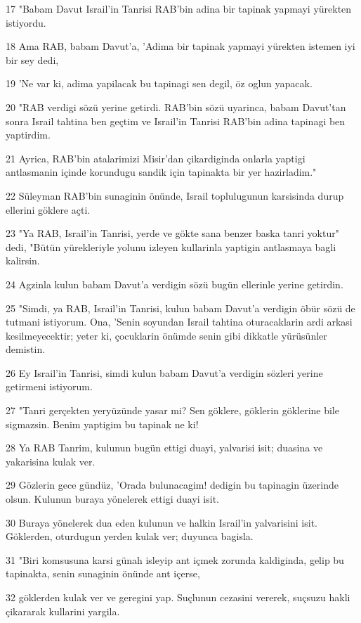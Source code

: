 \par 17 "Babam Davut Israil'in Tanrisi RAB'bin adina bir tapinak yapmayi yürekten istiyordu.
\par 18 Ama RAB, babam Davut'a, 'Adima bir tapinak yapmayi yürekten istemen iyi bir sey dedi,
\par 19 'Ne var ki, adima yapilacak bu tapinagi sen degil, öz oglun yapacak.
\par 20 "RAB verdigi sözü yerine getirdi. RAB'bin sözü uyarinca, babam Davut'tan sonra Israil tahtina ben geçtim ve Israil'in Tanrisi RAB'bin adina tapinagi ben yaptirdim.
\par 21 Ayrica, RAB'bin atalarimizi Misir'dan çikardiginda onlarla yaptigi antlasmanin içinde korundugu sandik için tapinakta bir yer hazirladim."
\par 22 Süleyman RAB'bin sunaginin önünde, Israil toplulugunun karsisinda durup ellerini göklere açti.
\par 23 "Ya RAB, Israil'in Tanrisi, yerde ve gökte sana benzer baska tanri yoktur" dedi, "Bütün yürekleriyle yolunu izleyen kullarinla yaptigin antlasmaya bagli kalirsin.
\par 24 Agzinla kulun babam Davut'a verdigin sözü bugün ellerinle yerine getirdin.
\par 25 "Simdi, ya RAB, Israil'in Tanrisi, kulun babam Davut'a verdigin öbür sözü de tutmani istiyorum. Ona, 'Senin soyundan Israil tahtina oturacaklarin ardi arkasi kesilmeyecektir; yeter ki, çocuklarin önümde senin gibi dikkatle yürüsünler demistin.
\par 26 Ey Israil'in Tanrisi, simdi kulun babam Davut'a verdigin sözleri yerine getirmeni istiyorum.
\par 27 "Tanri gerçekten yeryüzünde yasar mi? Sen göklere, göklerin göklerine bile sigmazsin. Benim yaptigim bu tapinak ne ki!
\par 28 Ya RAB Tanrim, kulunun bugün ettigi duayi, yalvarisi isit; duasina ve yakarisina kulak ver.
\par 29 Gözlerin gece gündüz, 'Orada bulunacagim! dedigin bu tapinagin üzerinde olsun. Kulunun buraya yönelerek ettigi duayi isit.
\par 30 Buraya yönelerek dua eden kulunun ve halkin Israil'in yalvarisini isit. Göklerden, oturdugun yerden kulak ver; duyunca bagisla.
\par 31 "Biri komsusuna karsi günah isleyip ant içmek zorunda kaldiginda, gelip bu tapinakta, senin sunaginin önünde ant içerse,
\par 32 göklerden kulak ver ve geregini yap. Suçlunun cezasini vererek, suçsuzu hakli çikararak kullarini yargila.
